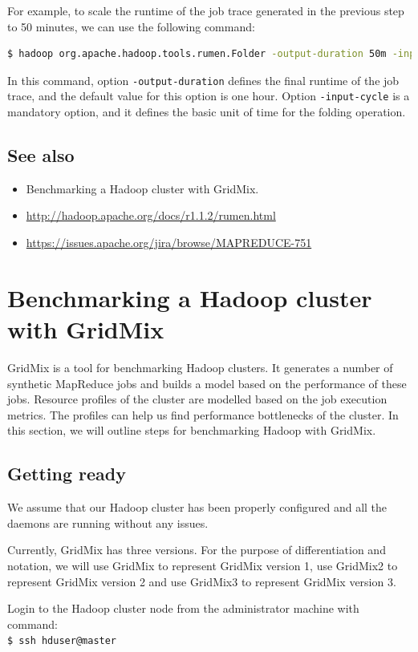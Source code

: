 For example, to scale the runtime of the job trace generated in the previous step to 50 minutes, we can use the following command:
\lstset{style=bashstyle}
\begin{lstlisting}[language=bash]
$ hadoop org.apache.hadoop.tools.rumen.Folder -output-duration 50m -input-cycle 20m file:///home/hduser/jobtraces.json file:///home/hduser/job-scaled-50min.json
\end{lstlisting}

In this command, option \verb|-output-duration| defines the final runtime of the job trace, and the default value for this option is one hour. Option \verb|-input-cycle| is a mandatory option, and it defines the basic unit of time for the folding operation.
\subsection*{See also}
\begin{itemize}
  \item Benchmarking a Hadoop cluster with GridMix.
  \item \url{http://hadoop.apache.org/docs/r1.1.2/rumen.html}
  \item \url{https://issues.apache.org/jira/browse/MAPREDUCE-751}
\end{itemize}
\section{Benchmarking a Hadoop cluster with GridMix}
GridMix is a tool for benchmarking Hadoop clusters. It generates a number of synthetic MapReduce jobs and builds a model based on the performance of these jobs. Resource profiles of the cluster are modelled based on the job execution metrics. The profiles can help us find performance bottlenecks of the cluster. In this section, we will outline steps for benchmarking Hadoop with GridMix.
\subsection*{Getting ready}
We assume that our Hadoop cluster has been properly configured and all the daemons are running without any issues.

Currently, GridMix has three versions. For the purpose of differentiation and notation, we will use GridMix to represent GridMix version 1, use GridMix2 to represent GridMix version 2 and use GridMix3 to represent GridMix version 3.

Login to the Hadoop cluster node from the administrator machine with command:\\
\verb|$ ssh hduser@master|
